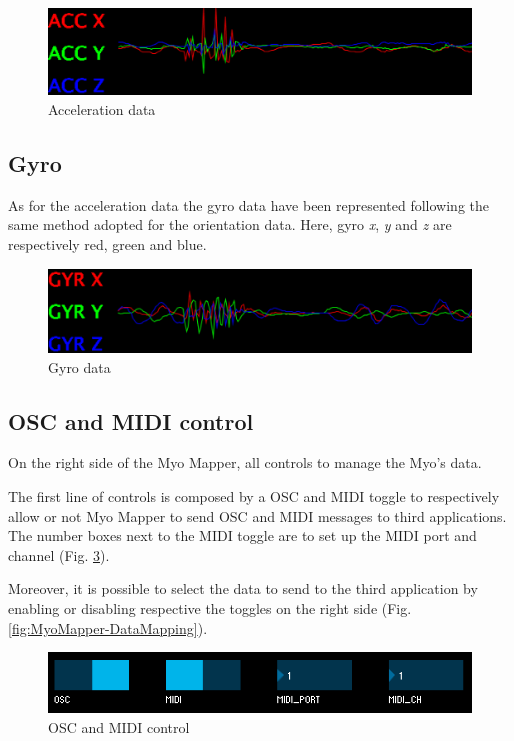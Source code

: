 \documentclass[12pt,a4paper]{article}
\begin{document}
		\begin{figure}[h]
			\centering
			\includegraphics[width=0.6\linewidth]{../images/MyoMapper-Acc}
			\caption{Acceleration data}
			\label{fig:MyoMapper-Acc}
		\end{figure}	
		
		\subsection{Gyro}
		As for the acceleration data the gyro data have been represented following the same method adopted for the orientation data. Here, gyro \textit{x}, \textit{y} and \textit{z} are respectively red, green and blue.
		
		\begin{figure}[h]
			\centering
			\includegraphics[width=0.6\linewidth]{../images/MyoMapper-Gyro}
			\caption{Gyro data}
			\label{fig:MyoMapper-Gyro}
		\end{figure}	
		
		\subsection{OSC and MIDI control}

		On the right side of the Myo Mapper, all controls to manage the Myo's data.
		
		The first line of controls is composed by a OSC and MIDI toggle to respectively allow or not Myo Mapper to send OSC and MIDI messages to third applications. The number boxes next to the MIDI toggle are to set up the MIDI port and channel (Fig. \ref{fig:MyoMapper-OSC-MIDI}).

		Moreover, it is possible to select the data to send to the third application by enabling or disabling respective the toggles on the right side (Fig. \ref{fig:MyoMapper-DataMapping}).
		
		\begin{figure}[h]
			\centering
			\includegraphics[width=0.6\linewidth]{../images/MyoMapper-OSC-MIDI}
			\caption{OSC and MIDI control}
			\label{fig:MyoMapper-OSC-MIDI}
		\end{figure}
		
\end{document}
